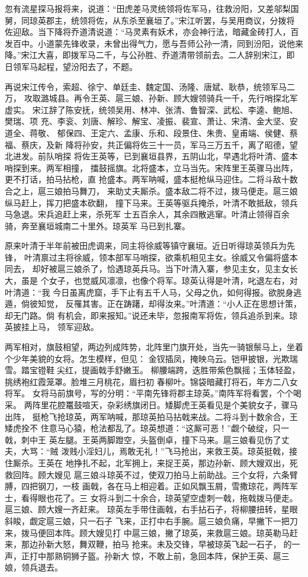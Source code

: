 忽有流星探马报将来，说道：“田虎差马灵统领将佐军马，往救汾阳，又差邬梨国
舅，同琼英郡主，统领将佐，从东杀至襄垣了。”宋江听罢，与吴用商议，分拨将
佐迎敌。当下降将乔道清说道：“马灵素有妖术，亦会神行法，暗藏金砖打人，百
发百中。小道蒙先锋收录，未曾出得气力，愿与吾师公孙一清，同到汾阳，说他来
降。”宋江大喜，即拨军马二千，与公孙胜、乔道清带领前去。二人辞别宋江，即
日领军马起程，望汾阳去了，不题。

再说宋江传令，索超、徐宁、单廷圭、魏定国、汤隆、唐斌、耿恭，统领军马二万，
攻取潞城县。再令王英、扈三娘、孙新、顾大嫂领骑兵一千，先行哨探北军虚实。
宋江辞了陈安抚，统领吴用、林冲、张清、鲁智深、武松、李逵、鲍旭、樊瑞、项
充、李衮、刘唐、解珍、解宝、凌振、裴宣、萧让、宋清、金大坚、安道全、蒋敬、
郁保四、王定六、孟康、乐和、段景住、朱贵、皇甫端、侯健、蔡福、蔡庆，及新
降将孙安，共正偏将佐三十一员，军马三万五千，离了昭德，望北进发。前队哨探
将佐王英等，已到襄垣县界，五阴山北，早遇北将叶清、盛本哨探到来。两军相撞，
擂鼓摇旗。北将盛本，立马当先。宋阵里王英骤马出阵，更不打话，拍马拈枪，直
抢盛本。两军呐喊，盛本挺枪纵马迎住。二将斗敌十数合之上，扈三娘拍马舞刀，
来助丈夫厮杀。盛本敌二将不过，拨马便走。扈三娘纵马赶上，挥刀把盛本砍翻，
撞下马来。王英等驱兵掩杀，叶清不敢抵敌，领兵马急退。宋兵追赶上来，杀死军
士五百余人，其余四散逃窜。叶清止领得百余骑，奔至襄垣城南二十里外。琼英军
马已到扎寨。

原来叶清于半年前被田虎调来，同主将徐威等镇守襄垣。近日听得琼英领兵为先锋，
叶清禀过主将徐威，领本部军马哨探，欲乘机相见主女。徐威又令偏将盛本同去，
却好被扈三娘杀了，恰遇琼英兵马。当下叶清入寨，参见主女，见主女长大，虽是
个女子，也觉威风凛凛，也像个将军。琼英认得是叶清，叱退左右，对叶清道：“我
今日虽离虎窟，手下止有五千人马，父母之仇，如何得报。欲脱身逃遁，倘彼知觉，
反罹其害。正在踌躇，却得汝来。”叶清道：“小人正在思想计策，却无门路。倘
有机会，即来报知。”说还未毕，忽报南军将佐，领兵追杀到来。琼英披挂上马，
领军迎敌。

两军相对，旗鼓相望，两边列成阵势，北阵里门旗开处，当先一骑银鬃马上，坐着
个少年美貌的女将。怎生模样，但见：
金钗插凤，掩映乌云。铠甲披银，光欺瑞雪。踏宝镫鞋尖红，提画戟手舒嫩玉。
柳腰端跨，迭胜带紫色飘摇；玉体轻盈，挑绣袍红霞笼罩。脸堆三月桃花，眉扫初
春柳叶。锦袋暗藏打将石，年方二八女将军。
女将马前旗号，写的分明：“平南先锋将郡主琼英。”南阵军将看罢，个个喝采。
两阵里花腔鼍鼓喧天，杂彩绣旗闭日。矮脚虎王英看见是个美貌女子，骤马出阵，
挺枪飞抢琼英，两军呐喊，那琼英拍马拈戟来战。二将斗到十数余合，王矮虎拴不
住意马心猿，枪法都乱了。琼英想道：“这厮可恶！”觑个破绽，只一戟，刺中王
英左腿。王英两脚蹬空，头盔倒卓，撞下马来。扈三娘看见伤了丈夫，大骂：“贼
泼贱小淫妇儿，焉敢无礼！”飞马抢出，来救王英。琼英挺戟，接住厮杀。王英在
地挣扎不起，北军拥上，来捉王英，那边孙新、顾大嫂双出，死救回阵。顾大嫂见
扈三娘斗琼英不过，使双刀拍马上前助战。三个女将，六条臂膊，四把钢刀，一枝
画戟，各在马上相迎着。正如风飘玉屑，雪撒琼花，两阵军士，看得眼也花了。三
女将斗到二十余合，琼英望空虚刺一戟，拖戟拨马便走。扈三娘、顾大嫂一齐赶来。
琼英左手带住画戟，右手拈石子，将柳腰扭转，星眼斜睃，觑定扈三娘，只一石子
飞来，正打中右手腕。扈三娘负痛，早撇下一把刀来，拨马便回本阵。顾大嫂见打
中扈三娘，撇了琼英，来救扈三娘。琼英勒马赶来，那边孙新大怒，舞双鞭，拍马
抢来。未及交锋，早被琼英飞起一石子，的一声，正打中那熟铜狮子盔。孙新大
惊，不敢上前，急回本阵，保护王英、扈三娘，领兵退去。

